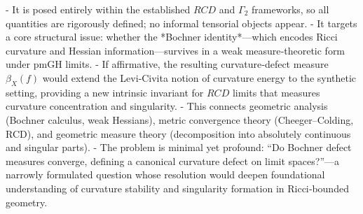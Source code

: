 - It is posed entirely within the established \(RCD\) and \(Γ_2\) frameworks, so all quantities are rigorously defined; no informal tensorial objects appear.  
- It targets a core structural issue: whether the *Bochner identity*—which encodes Ricci curvature and Hessian information—survives in a weak measure‑theoretic form under pmGH limits.  
- If affirmative, the resulting curvature‑defect measure \(\beta_X(f)\) would extend the Levi‑Civita notion of curvature energy to the synthetic setting, providing a new intrinsic invariant for \(RCD\) limits that measures curvature concentration and singularity.  
- This connects geometric analysis (Bochner calculus, weak Hessians), metric convergence theory (Cheeger–Colding, RCD), and geometric measure theory (decomposition into absolutely continuous and singular parts).  
- The problem is minimal yet profound: “Do Bochner defect measures converge, defining a canonical curvature defect on limit spaces?”—a narrowly formulated question whose resolution would deepen foundational understanding of curvature stability and singularity formation in Ricci‑bounded geometry.